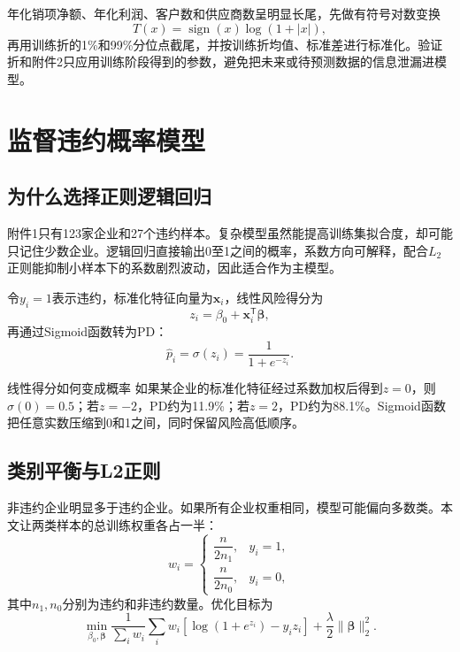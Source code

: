 \documentclass[12pt,a4paper]{ctexart}
\begin{document}
年化销项净额、年化利润、客户数和供应商数呈明显长尾，先做有符号对数变换
\begin{equation}
T(x)=\operatorname{sign}(x)\log(1+|x|),
\end{equation}
再用训练折的1\%和99\%分位点截尾，并按训练折均值、标准差进行标准化。验证折和附件2只应用训练阶段得到的参数，避免把未来或待预测数据的信息泄漏进模型。

\section{监督违约概率模型}

\subsection{为什么选择正则逻辑回归}

附件1只有123家企业和27个违约样本。复杂模型虽然能提高训练集拟合度，却可能只记住少数企业。逻辑回归直接输出0至1之间的概率，系数方向可解释，配合$L_2$正则能抑制小样本下的系数剧烈波动，因此适合作为主模型\cite{hosmer2013,hastie2009}。

令$y_i=1$表示违约，标准化特征向量为$\boldsymbol x_i$，线性风险得分为
\begin{equation}
z_i=\beta_0+\boldsymbol x_i^{\mathsf T}\boldsymbol\beta,
\end{equation}
再通过Sigmoid函数转为PD：
\begin{equation}
\hat p_i=\sigma(z_i)=\frac{1}{1+e^{-z_i}}.
\end{equation}

\begin{intuitionbox}{线性得分如何变成概率}
如果某企业的标准化特征经过系数加权后得到$z=0$，则$\sigma(0)=0.5$；若$z=-2$，PD约为11.9\%；若$z=2$，PD约为88.1\%。Sigmoid函数把任意实数压缩到0和1之间，同时保留风险高低顺序。
\end{intuitionbox}

\subsection{类别平衡与L2正则}

非违约企业明显多于违约企业。如果所有企业权重相同，模型可能偏向多数类。本文让两类样本的总训练权重各占一半：
\begin{equation}
w_i=\begin{cases}
\dfrac{n}{2n_1},&y_i=1,\\[4pt]
\dfrac{n}{2n_0},&y_i=0,
\end{cases}
\end{equation}
其中$n_1,n_0$分别为违约和非违约数量。优化目标为
\begin{equation}
\min_{\beta_0,\boldsymbol\beta}
\frac{1}{\sum_iw_i}\sum_iw_i\left[\log(1+e^{z_i})-y_iz_i\right]
+\frac{\lambda}{2}\|\boldsymbol\beta\|_2^2.
\end{equation}
\end{document}
